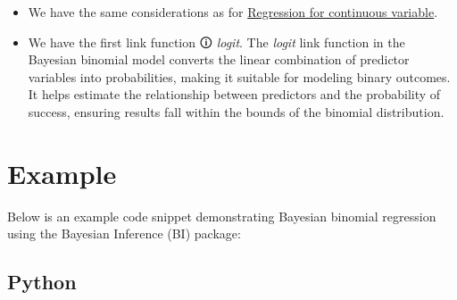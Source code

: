 \documentclass[
  letterpaper,
  DIV=11,
  numbers=noendperiod]{scrreprt}
\begin{document}
\begin{tcolorbox}[enhanced jigsaw, toptitle=1mm, opacityback=0, titlerule=0mm, breakable, bottomrule=.15mm, colframe=quarto-callout-caution-color-frame, arc=.35mm, coltitle=black, left=2mm, opacitybacktitle=0.6, leftrule=.75mm, toprule=.15mm, rightrule=.15mm, bottomtitle=1mm, colbacktitle=quarto-callout-caution-color!10!white, title=\textcolor{quarto-callout-caution-color}{\faFire}\hspace{0.5em}{Caution}, colback=white]

\begin{itemize}
\item
  We have the same considerations as for
  \href{1.\%20Linear\%20Regression\%20for\%20continuous\%20variable.qmd}{Regression
  for continuous variable}.
\item
  We have the first \label{linkF}{{link function 🛈}}
  \emph{logit}. The \emph{logit} link function in the Bayesian binomial
  model converts the linear combination of predictor variables into
  probabilities, making it suitable for modeling binary outcomes. It
  helps estimate the relationship between predictors and the probability
  of success, ensuring results fall within the bounds of the binomial
  distribution.
\end{itemize}

\end{tcolorbox}

\section{Example}\label{example-4}

Below is an example code snippet demonstrating Bayesian binomial
regression using the Bayesian Inference (BI) package:

\subsection{Python}
\end{document}
